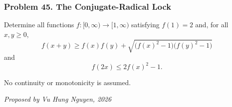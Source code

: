 \subsubsection*{Problem 45. The Conjugate-Radical Lock}

\begin{exercisebox}[medium]

Determine all functions $f:[0,\infty)\to[1,\infty)$ satisfying $f(1)=2$ and, for all $x,y\ge0$,
\[
\boxed{
f(x+y)\ge
f(x)f(y)+
\sqrt{\bigl(f(x)^2-1\bigr)\bigl(f(y)^2-1\bigr)}
}
\tag{1}
\]
and
\[
\boxed{\qquad f(2x)\le 2f(x)^2-1.\qquad} \tag{2}
\]

No continuity or monotonicity is assumed.

\begin{flushright}
\textit{Proposed by Vu Hung Nguyen, 2026}
\end{flushright}


\end{exercisebox}
